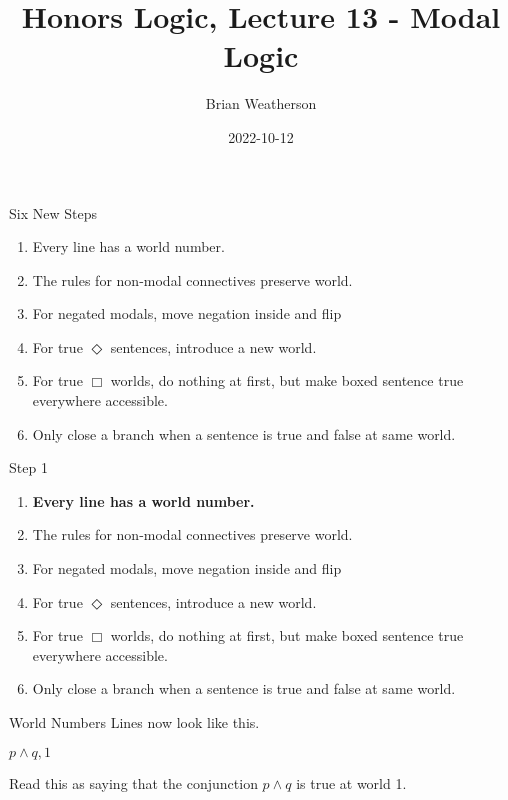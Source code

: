 \documentclass[
  14pt,
  letterpaper,
  ignorenonframetext,
  aspectratio=169,
]{beamer}
\title{Honors Logic, Lecture 13 - Modal Logic}
\author{Brian Weatherson}
\date{2022-10-12}
\providecommand{\tightlist}{%
  \setlength{\itemsep}{0pt}\setlength{\parskip}{0pt}}\usepackage{longtable,booktabs,array}
\begin{document}
\frame{\titlepage}
\ifdefined\Shaded\renewenvironment{Shaded}{\begin{tcolorbox}[borderline west={3pt}{0pt}{shadecolor}, frame hidden, boxrule=0pt, enhanced, interior hidden, breakable, sharp corners]}{\end{tcolorbox}}\fi

\begin{frame}{Six New Steps}
\protect\hypertarget{six-new-steps}{}
\begin{enumerate}
\tightlist
\item
  Every line has a world number.
\item
  The rules for non-modal connectives preserve world.
\item
  For negated modals, move negation inside and flip
\item
  For true \(\Diamond\) sentences, introduce a new world.
\item
  For true \(\Box\) worlds, do nothing at first, but make boxed sentence
  true everywhere accessible.
\item
  Only close a branch when a sentence is true and false at same world.
\end{enumerate}
\end{frame}

\begin{frame}{Step 1}
\protect\hypertarget{step-1}{}
\begin{enumerate}
\tightlist
\item
  \textbf{Every line has a world number.}
\item
  The rules for non-modal connectives preserve world.
\item
  For negated modals, move negation inside and flip
\item
  For true \(\Diamond\) sentences, introduce a new world.
\item
  For true \(\Box\) worlds, do nothing at first, but make boxed sentence
  true everywhere accessible.
\item
  Only close a branch when a sentence is true and false at same world.
\end{enumerate}
\end{frame}

\begin{frame}{World Numbers}
\protect\hypertarget{world-numbers}{}
Lines now look like this.

\begin{center}
$p \wedge q, 1$
\end{center}

Read this as saying that the conjunction \(p \wedge q\) is true at world
1.
\end{frame}
\end{document}
